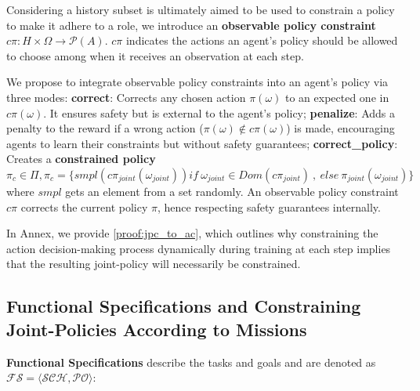 \documentclass[sigconf,anonymous]{aamas}
\begin{document}
Considering a history subset is ultimately aimed to be used to constrain a policy to make it adhere to a role, we introduce an \textbf{observable policy constraint} $c\pi: H \times \Omega \rightarrow \mathcal{P}(A)$. $c\pi$ indicates the actions an agent's policy should be allowed to choose among when it receives an observation at each step.

%     

We propose to integrate observable policy constraints into an agent's policy via three modes:
\textbf{correct}: Corrects any chosen action $\pi(\omega)$ to an expected one in $c\pi(\omega)$. It ensures safety but is external to the agent's policy; \quad
\textbf{penalize}: Adds a penalty to the reward if a wrong action ($\pi(\omega) \notin c\pi(\omega)$) is made, encouraging agents to learn their constraints but without safety guarantees; \quad
\textbf{correct\_policy}: Creates a \textbf{constrained policy} $\pi_c \in \Pi, \pi_c = \{smpl(c\pi_{joint}(\omega_{joint})) \allowbreak if \ \omega_{joint} \in Dom(c\pi_{joint}) \ \allowbreak, \ \allowbreak else \ \allowbreak \pi_{joint}(\omega_{joint})\}$ where $smpl$ gets an element from a set randomly. An observable policy constraint $c\pi$ corrects the current policy $\pi$, hence respecting safety guarantees internally.

In Annex, we provide \autoref{proof:jpc_to_ac}, which outlines why constraining the action decision-making process dynamically during training at each step implies that the resulting joint-policy will necessarily be constrained.


\subsection{Functional Specifications and Constraining Joint-Policies According to Missions}

\textbf{Functional Specifications} describe the tasks and goals and are denoted as $\mathcal{FS} = \langle \mathcal{SCH}, \mathcal{PO} \rangle$:
\end{document}

